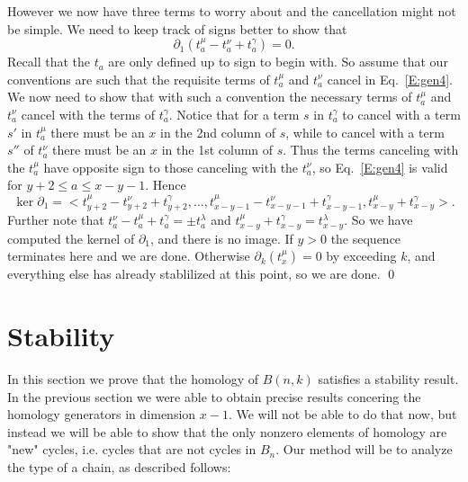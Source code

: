 \documentclass{elsart}
\begin{document}
\begin{pf}
  However we now have three terms to worry about and the cancellation might not be simple. We need to keep track of signs better to show 
  that 
  \begin{equation}\label{E:gen4}
    \partial_1(t^\mu_a -t^\nu_a + t^\gamma_a) = 0.
  \end{equation}
  Recall that the $t_a$ are only defined up to sign to begin with. So assume that our
  conventions are such that the requisite terms of $t^\mu_a$ and $t^\nu_a$ cancel in Eq.~\ref{E:gen4}. We now need to show that with 
  such a convention the necessary terms of $t^\mu_a$ and $t^\nu_a$ cancel with the terms of $t^\gamma_a$. Notice that for a term $s$ in 
  $t^\gamma_a$ to cancel with a term $s'$ in $t^\mu_a$ there must be an $x$ in the 2nd column of $s$, while to cancel with a term $s''$ of 
  $t^\nu_a$ there must be an $x$ in the 1st column of $s$. Thus the terms canceling with the $t^\mu_a$ have opposite sign to those 
  canceling with the $t^\nu_a$, so Eq.~\ref{E:gen4} is valid for $y+2 \le a \le x-y-1$. Hence $$\ker \partial_1 = < 
  t^\mu_{y+2} -t^\nu_{y+2} + t^\gamma_{y+2}, \ldots, t^\mu_{x-y-1} -t^\nu_{x-y-1} + t^\gamma_{x-y-1}, t^\mu_{x-y}+ t^\gamma_{x-y}>.$$
  Further note that $t^\nu_a-t^\mu_a+ t^\gamma_a = \pm t^\lambda_a$ and $t^\mu_{x-y}+t^\gamma_{x-y} = t^\lambda_{x-y}$.
  So we have computed the kernel of $\partial_1$, and there is no image. If $y>0$ the sequence terminates here and we are done. Otherwise
  $\partial_k(t^\mu_x)= 0$ by exceeding $k$, and everything else has already stablilized at this point, so we are done.
\qed
\end{pf}  




\section{Stability} \label{S:stability}

In this section we prove that the homology of $B(n, k)$ satisfies a stability result. In the previous section we were able
to obtain precise results concering the homology generators in dimension $x-1$. We will not be able to do that now, but 
instead we will be able to show that the only nonzero elements of homology are "new" cycles, i.e. cycles that are not 
cycles in $B_n$.  Our method will be to analyze the type of a chain, as described follows:
\end{document}
